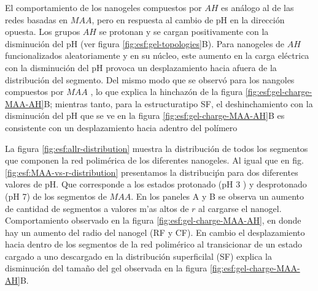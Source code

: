 El comportamiento de los nanogeles compuestos por $AH$ es an\'alogo al de las redes basadas en $MAA$, pero en respuesta al cambio de pH en la direcci\'on opuesta.
Los grupos $AH$ se protonan y se cargan positivamente con la disminuci\'on del pH (ver figura \ref{fig:esf:gel-topologies}B).
Para nanogeles de $AH$ funcionalizados aleatoriamente y en su n\'ucleo, este aumento en la carga el\'ectrica con la disminución del pH provoca un desplazamiento hacia afuera de la distribuci\'on del segmento. Del mismo modo que se observ\'o para los nangoles compuestos por $MAA$%
, lo que explica la hinchaz\'on de la figura \ref{fig:esf:gel-charge-MAA-AH}B;
mientras tanto, para la estructuratipo SF, el deshinchamiento con la disminuci\'on del pH que se ve en la figura \ref{fig:esf:gel-charge-MAA-AH}B es consistente con un desplazamiento hacia adentro del pol\'imero %


La figura \ref{fig:esf:allr-distribution} muestra la distribuci\'on de todos los segmentos que componen la red polim\'erica de los diferentes nanogeles. 
Al igual que en fig. \ref{fig:esf:MAA-vs-r-distribution} presentamos la distribuci\'pn para dos diferentes valores de pH. Que corresponde a los estados protonado (pH 3 ) y desprotonado (pH 7) de los segmentos de $MAA$.  En los paneles A y B se observa un aumento de cantidad de segmentos a valores m'as altos de $r$ al cargarse el nanogel. Comportamiento observado en la figura \ref{fig:esf:gel-charge-MAA-AH}, en donde hay un aumento del radio del nanogel (RF y CF).
En cambio el desplazamiento hacia dentro de los segmentos de la red polim\'erico al transicionar de un estado cargado a uno descargado en la distribuci\'on superficilal (SF) explica la disminuci\'on del tama\~no del gel observada en la figura \ref{fig:esf:gel-charge-MAA-AH}B.

